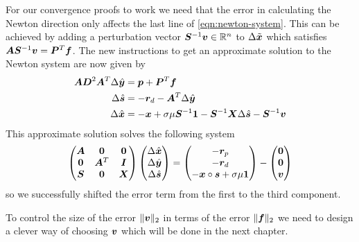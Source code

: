 For our convergence proofs to work we need that the error in calculating the Newton direction only affects the last line of \cref{eqn:newton-system}.
This can be achieved by adding a perturbation vector \(\bm{S}^{-1}\bm{v} \in \mathbb{R}^n\) to \(\Delta\tilde{\bm{x}}\) which satisfies \(\bm{A}\bm{S}^{-1}\bm{v} = \bm{P}^T \bm{f}\).
The new instructions to get an approximate solution to the Newton system are now given by
\begin{subequations}
  \begin{align}
    \bm{A} \bm{D}^2 \bm{A}^T \Delta\hat{\bm{y}} &= \bm{p} + \bm{P}^{T} \bm{f} \\
    \Delta\hat{\bm{s}} &= -\bm{r}_d - \bm{A}^T \Delta\hat{\bm{y}} \\
    \Delta\hat{\bm{x}} &= -\bm{x} + \sigma \mu \bm{S}^{-1} \bm{1} - \bm{S}^{-1} \bm{X} \Delta\hat{\bm{s}} - \bm{S}^{-1} \bm{v}
  \end{align}
\end{subequations}
This approximate solution solves the following system
\begin{equation}
  \begin{pmatrix}
    \bm{A} & \bm{0}   & \bm{0} \\
    \bm{0} & \bm{A}^T & \bm{I} \\
    \bm{S} & \bm{0}   & \bm{X} \\
  \end{pmatrix}
  \begin{pmatrix} \Delta\hat{\bm{x}} \\ \Delta\hat{\bm{y}} \\ \Delta\hat{\bm{s}} \end{pmatrix}
  =
  \begin{pmatrix} -\bm{r}_p \\ -\bm{r}_d \\ -\bm{x} \circ \bm{s} + \sigma \mu \bm{1} \end{pmatrix}
  -
  \begin{pmatrix} \bm{0} \\ \bm{0} \\ \bm{v} \end{pmatrix}
\end{equation}
so we successfully shifted the error term from the first to the third component.

To control the size of the error \(\lVert \bm{v} \rVert_2\) in terms of the error \(\lVert \bm{f} \rVert_2\) we need to design a clever way of choosing \(\bm{v}\) which will be done in the next chapter.
